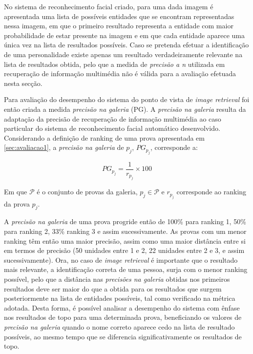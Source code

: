 No sistema de reconhecimento facial criado, para uma dada imagem é apresentada uma lista de possíveis entidades que se encontram representadas nessa imagem, em que o primeiro resultado representa a entidade com maior probabilidade de estar presente na imagem e em que cada entidade aparece uma única vez na lista de resultados possíveis. Caso se pretenda efetuar a identificação de uma personalidade existe apenas um resultado verdadeiramente relevante na lista de resultados obtida, pelo que a medida de \textit{precisão a n} utilizada em recuperação de informação multimédia não é válida para a avaliação efetuada nesta secção.

Para avaliação do desempenho do sistema do ponto de vista de \textit{image retrieval} foi então criada a medida \textit{precisão na galeria} (PG). A \textit{precisão na galeria} resulta da adaptação da precisão de recuperação de informação multimédia ao caso particular do sistema de reconhecimento facial automático desenvolvido. Considerando a definição de ranking de uma prova apresentada em \ref{sec:avaliacao1}, a \textit{precisão na galeria} de $p_j$, $PG_{p_j}$, corresponde a:

\begin{equation}
PG_{p_j} = \frac{1}{r_{p_j}} \times 100
\end{equation}

Em que $\mathscr{P}$ é o conjunto de provas da galeria, $p_j \in \mathscr{P}$ e $r_{p_j}$ corresponde ao ranking da prova $p_j$.

A \textit{precisão na galeria} de uma prova progride então de 100\% para ranking 1, 50\% para ranking 2, 33\% ranking 3 e assim sucessivamente. As provas com um menor ranking têm então uma maior precisão, assim como uma maior distância entre si em termos de precisão (50 unidades entre 1 e 2, 22 unidades entre 2 e 3, e assim sucessivamente). Ora, no caso de \textit{image retrieval} é importante que o resultado mais relevante, a identificação correta de uma pessoa, surja com o menor ranking possível, pelo que a distância nas \textit{precisões na galeria} obtidas nos primeiros resultados deve ser maior do que a obtida para os resultados que surgem posteriormente na lista de entidades possíveis, tal como verificado na métrica adotada. Desta forma, é possível analisar a desempenho do sistema com ênfase nos resultados de topo para uma determinada prova, beneficiando os valores de \textit{precisão na galeria} quando o nome correto aparece cedo na lista de resultado possíveis, ao mesmo tempo que se diferencia significativamente os resultados de topo.

